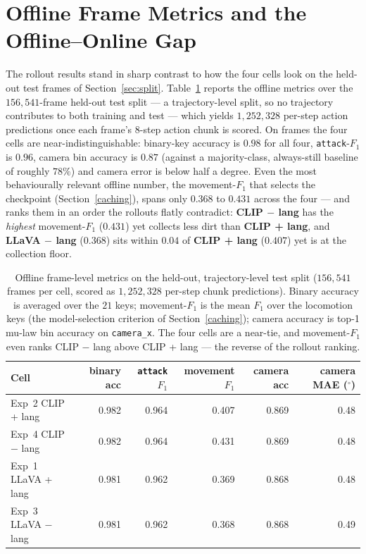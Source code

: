 \section{Offline Frame Metrics and the Offline--Online Gap}
\label{sec:exp-offline}

The rollout results stand in sharp contrast to how the four cells look on the
held-out test frames of Section~\ref{sec:split}. Table~\ref{tab:offline} reports
the offline metrics over the $156{,}541$-frame held-out test split --- a
trajectory-level split, so no trajectory contributes to both training and test ---
which yields $1{,}252{,}328$ per-step action predictions once each frame's
$8$-step action chunk is scored. On frames the four
cells are near-indistinguishable: binary-key accuracy is $0.98$ for all four,
\texttt{attack}-$F_1$ is $0.96$, camera bin accuracy is $0.87$ (against a
majority-class, always-still baseline of roughly $78\%$) and camera error is
below half a degree. Even the most behaviourally relevant offline number, the
movement-$F_1$ that selects the checkpoint (Section~\ref{caching}), spans only
$0.368$ to $0.431$ across the four --- and ranks them in an order the rollouts
flatly contradict: \textbf{CLIP $-$ lang} has the \emph{highest} movement-$F_1$
($0.431$) yet collects less dirt than \textbf{CLIP + lang}, and \textbf{LLaVA
$-$ lang} ($0.368$) sits within $0.04$ of \textbf{CLIP + lang} ($0.407$) yet is
at the collection floor.

\begin{table}[ht]
\centering
\begin{tabular}{lrrrrr}
\hline
Cell & binary acc & \texttt{attack} $F_1$ & movement $F_1$ & camera acc & camera MAE ($^\circ$) \\
\hline
Exp~2 CLIP + lang    & 0.982 & 0.964 & 0.407 & 0.869 & 0.48 \\
Exp~4 CLIP $-$ lang  & 0.982 & 0.964 & 0.431 & 0.869 & 0.48 \\
Exp~1 LLaVA + lang   & 0.981 & 0.962 & 0.369 & 0.868 & 0.48 \\
Exp~3 LLaVA $-$ lang & 0.981 & 0.962 & 0.368 & 0.868 & 0.49 \\
\hline
\end{tabular}
\caption{Offline frame-level metrics on the held-out, trajectory-level test
split ($156{,}541$ frames per cell, scored as $1{,}252{,}328$ per-step chunk
predictions). Binary accuracy is averaged over the $21$ keys; movement-$F_1$ is
the mean $F_1$ over the locomotion keys (the model-selection criterion of
Section~\ref{caching}); camera accuracy is top-1 mu-law bin accuracy on
\texttt{camera\_x}. The four cells are a near-tie, and movement-$F_1$ even ranks
CLIP $-$ lang above CLIP + lang --- the reverse of the rollout ranking.}
\label{tab:offline}
\end{table}


